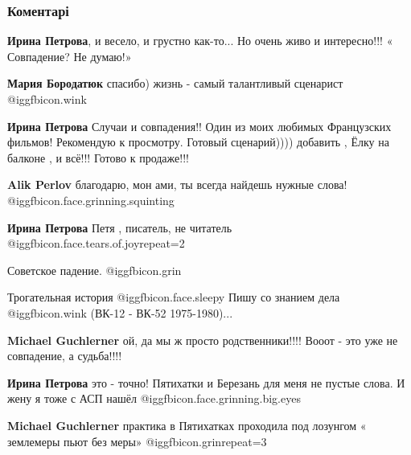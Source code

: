  
 
 
 
 
\subsubsection{Коментарі}

\begin{itemize} %
\textbf{Ирина Петрова}, и весело, и грустно как-то... Но очень живо и интересно!!! « Совпадение? Не думаю!»

\begin{itemize} %
\textbf{Мария Бородатюк} спасибо) жизнь - самый талантливый сценарист @igg{fbicon.wink} 

\textbf{Ирина Петрова} Случаи и совпадения!! Один из моих любимых Французских фильмов! Рекомендую к просмотру. Готовый сценарий)))) добавить , Ёлку на балконе , и всё!!! Готово к продаже!!!

\textbf{Alik Perlov} благодарю, мон ами, ты всегда найдешь нужные слова! @igg{fbicon.face.grinning.squinting} 

\textbf{Ирина Петрова} Петя , писатель, не читатель @igg{fbicon.face.tears.of.joy}{repeat=2} 
\end{itemize} %

Советское падение.  @igg{fbicon.grin} 


Трогательная история @igg{fbicon.face.sleepy} 
Пишу со знанием дела  @igg{fbicon.wink}  (ВК-12 - ВК-52 1975-1980)...

\begin{itemize} %
\textbf{Michael Guchlerner} ой, да мы ж просто родственники!!!! Вооот - это уже не совпадение, а судьба!!!!

\textbf{Ирина Петрова} это - точно! Пятихатки и Березань для меня не пустые слова.
И жену я тоже с АСП нашёл  @igg{fbicon.face.grinning.big.eyes} 

\textbf{Michael Guchlerner} практика в Пятихатках проходила под лозунгом « землемеры пьют без меры» @igg{fbicon.grin}{repeat=3} 


\end{itemize}
\end{itemize}
